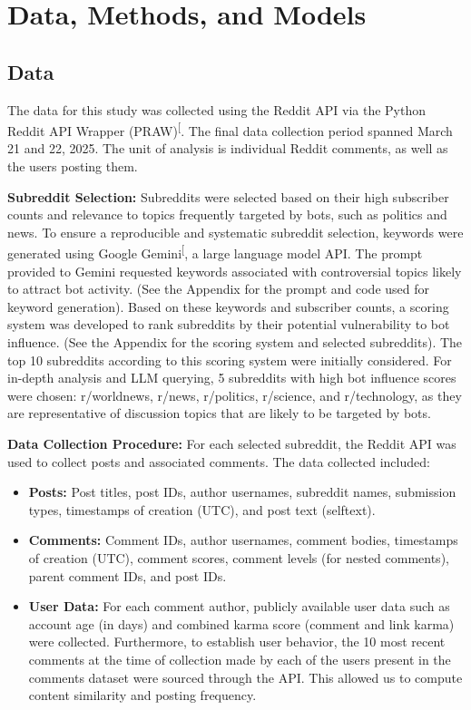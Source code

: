\documentclass[
  12pt,
  letterpaper,
  DIV=11,
  numbers=noendperiod,
  abstract]{scrartcl}
\providecommand{\tightlist}{%
  \setlength{\itemsep}{0pt}\setlength{\parskip}{0pt}}\usepackage{longtable,booktabs,array}
\begin{document}
\section{Data, Methods, and Models}\label{data-methods-and-models}

\subsection{Data}\label{data}

The data for this study was collected using the Reddit API via the
Python Reddit API Wrapper
(PRAW)\textsuperscript{{[}\citeproc{ref-praw2024}{18}{]}}. The final
data collection period spanned March 21 and 22, 2025. The unit of
analysis is individual Reddit comments, as well as the users posting
them.

\textbf{Subreddit Selection:} Subreddits were selected based on their
high subscriber counts and relevance to topics frequently targeted by
bots, such as politics and news. To ensure a reproducible and systematic
subreddit selection, keywords were generated using Google
Gemini\textsuperscript{{[}\citeproc{ref-googleai2023gemini}{19}{]}}, a
large language model API. The prompt provided to Gemini requested
keywords associated with controversial topics likely to attract bot
activity. (See the Appendix for the prompt and code used for keyword
generation). Based on these keywords and subscriber counts, a scoring
system was developed to rank subreddits by their potential vulnerability
to bot influence. (See the Appendix for the scoring system and selected
subreddits). The top 10 subreddits according to this scoring system were
initially considered. For in-depth analysis and LLM querying, 5
subreddits with high bot influence scores were chosen: r/worldnews,
r/news, r/politics, r/science, and r/technology, as they are
representative of discussion topics that are likely to be targeted by
bots.

\textbf{Data Collection Procedure:} For each selected subreddit, the
Reddit API was used to collect posts and associated comments. The data
collected included:

\begin{itemize}
\tightlist
\item
  \textbf{Posts:} Post titles, post IDs, author usernames, subreddit
  names, submission types, timestamps of creation (UTC), and post text
  (selftext).
\item
  \textbf{Comments:} Comment IDs, author usernames, comment bodies,
  timestamps of creation (UTC), comment scores, comment levels (for
  nested comments), parent comment IDs, and post IDs.
\item
  \textbf{User Data:} For each comment author, publicly available user
  data such as account age (in days) and combined karma score (comment
  and link karma) were collected. Furthermore, to establish user
  behavior, the 10 most recent comments at the time of collection made
  by each of the users present in the comments dataset were sourced
  through the API. This allowed us to compute content similarity and
  posting frequency.
\end{itemize}
\end{document}
